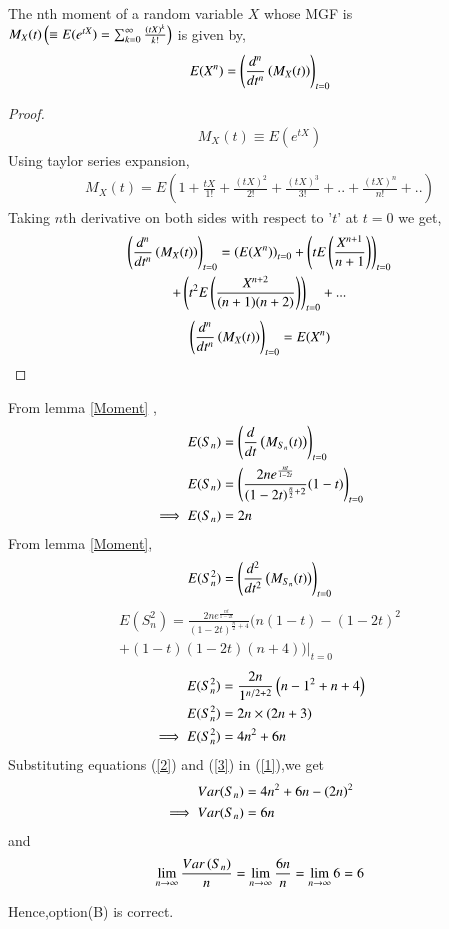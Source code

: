 \documentclass[journal,12pt,twocolumn]{IEEEtran}
\begin{document}
\begin{lemma}
 The nth moment of a random variable $X$ whose MGF is $M_{X}(t)\left(\equiv E(e^{tX})=\sum_{k=0}^{\infty}\frac{(tX)^k}{k!}\right)$ is given by,
 \begin{align}
     E(X^{n})=\left(\frac{d^{n}}{dt^{n}}\left(M_{X}(t)\right)\right)_{t=0}
     \label{4}
 \end{align}
 \label{Moment}
\end{lemma}
\begin{proof}
\begin{align}
    M_{X}(t)\equiv E(e^{tX})
\end{align}
Using taylor series expansion,
\begin{align}
 M_{X}(t)=E(1+\frac{tX}{1!}+\frac{(tX)^2}{2!}+\frac{(tX)^3}{3!}+..+\frac{(tX)^n}{n!}+..)
\end{align}
Taking $n$th derivative  on both sides with respect to '$t$' at $t=0$ we get,
\begin{multline}
\left(\frac{d^{n}}{dt^{n}}\left(M_{X}(t)\right)\right)_{t=0}=\left(E(X^n)\right)_{t=0}+\left(tE\left(\frac{X^{n+1}}{n+1}\right)\right)_{t=0}\\
+\left(t^2E\left(\frac{X^{n+2}}{(n+1)(n+2)}\right)\right)_{t=0}+...
\end{multline}
\begin{align}
    \left(\frac{d^{n}}{dt^{n}}\left(M_{X}(t)\right)\right)_{t=0}=E(X^{n})
\end{align}
\end{proof}
From lemma \ref{Moment} ,
\begin{align}
 E(S_{n})&=\left(\frac{d}{dt}\left(M_{S_{n}}(t)\right)\right)_{t=0}
\\E(S_{n})&=\left(\frac{2ne^{\frac{nt}{1-2t}}}{(1-2t)^{\frac{n}{2}+2}}(1-t)\right)_{t=0}
\\\implies  E(S_{n})&=2n \label{2}
\end{align}
From lemma \ref{Moment},
\begin{align}
  E(S_{n}^2)=\left(\frac{d^{2}}{dt^{2}}\left(M_{S_{n}}(t)\right)\right)_{t=0}
\end{align}
\begin{multline}
 E(S_{n}^2)=\frac{2ne^{\frac{nt}{1-2t}}}{(1-2t)^{\frac{n}{2}+4}}(n(1-t)-(1-2t)^{2}\\
 +(1-t)(1-2t)(n+4))|_{t=0}
\end{multline}
\begin{align}
E(S_{n}^2)&=\frac{2n}{1^{n/2+2}}\left(n-1^2+n+4\right)
\\E(S_{n}^2)&=2n\times(2n+3)
\\\implies E(S_{n}^2)&=4n^{2}+6n
\label{3}
\end{align}
Substituting equations (\ref{2}) and (\ref{3}) in (\ref{1}),we get 
\begin{align}
    Var(S_{n})&=4n^{2}+6n-\left(2n\right)^{2}
\\ \implies Var(S_{n})&=6n
\end{align}
and
$$\lim_{n \to \infty}{\frac{Var\left(S_{n}\right)}{n}}=\lim_{n \to \infty}{\frac{6n}{n}}=\lim_{n \to \infty}{6}=6$$

Hence,option(B) is correct.
    
 
\end{document}
